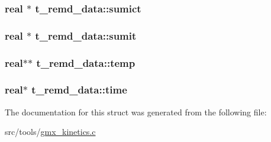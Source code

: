 \hypertarget{structt__remd__data_a91f73a2dfff075d6f6d1a3ea8be3cff8}{
\subsubsection[{sumict}]{\setlength{\rightskip}{0pt plus 5cm}real $\ast$ {\bf t\-\_\-remd\-\_\-data\-::sumict}}}\label{structt__remd__data_a91f73a2dfff075d6f6d1a3ea8be3cff8}
\hypertarget{structt__remd__data_a552c715f244f973500b0f3557c71aea3}{
\subsubsection[{sumit}]{\setlength{\rightskip}{0pt plus 5cm}real $\ast$ {\bf t\-\_\-remd\-\_\-data\-::sumit}}}\label{structt__remd__data_a552c715f244f973500b0f3557c71aea3}
\hypertarget{structt__remd__data_a4d4e5efd43786e5380b68e4ada72ad68}{
\subsubsection[{temp}]{\setlength{\rightskip}{0pt plus 5cm}real$\ast$$\ast$ {\bf t\-\_\-remd\-\_\-data\-::temp}}}\label{structt__remd__data_a4d4e5efd43786e5380b68e4ada72ad68}
\hypertarget{structt__remd__data_a91360ea85dfb7b54a785b30260a0dcf4}{
\subsubsection[{time}]{\setlength{\rightskip}{0pt plus 5cm}real$\ast$ {\bf t\-\_\-remd\-\_\-data\-::time}}}\label{structt__remd__data_a91360ea85dfb7b54a785b30260a0dcf4}


\-The documentation for this struct was generated from the following file\-:\begin{DoxyCompactItemize}
\item 
src/tools/\hyperlink{gmx__kinetics_8c}{gmx\-\_\-kinetics.\-c}\end{DoxyCompactItemize}
